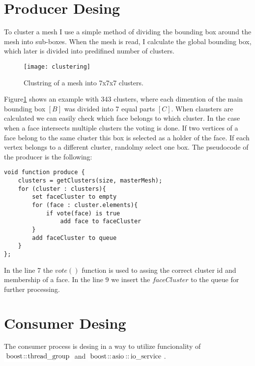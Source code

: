 \newpage
\section{Producer Desing}

To cluster a mesh I use a simple method of dividing the bounding box around the mesh into sub-boxes. When the mesh is read, I calculate the global bounding box, which later is divided into predifined number of clusters.

\begin{figure}[H]
  \begin{center}
    \texttt{[image: clustering]}
    \caption{Clustring of a mesh into 7x7x7 clusters.}
    \label{fig:clustering}
  \end{center}
\end{figure}

Figure\ref{fig:clustering} shows an example with 343 clusters, where each dimention of the main bounding box $[B]$ was divided into 7 equal parts $[C]$. When clausters are calculated we can easily check which face belongs to which cluster. In the case when a face intersects multiple clusters the voting is done. If two vertices of a face belong to the same cluster this box is selected as a holder of the face. If each vertex belongs to a different cluster, randolmy select one box. The pseudocode of the producer is the following:
\newline
\begin{center}
\begin{lstlisting}[caption={C style psuedocode of a producer},captionpos=b]
void function produce {
    clusters = getClusters(size, masterMesh);
    for (cluster : clusters){
        set faceCluster to empty
        for (face : cluster.elements){
            if vote(face) is true
                add face to faceCluster
        }
        add faceCluster to queue
    }
};
\end{lstlisting}
\end{center}

In the line 7 the $vote()$ function is used to assing the correct cluster id and membership of a face. In the line 9 we insert the $faceCluster$ to the queue for further processing.

\newpage
\section{Consumer Desing}

The consumer process is desing in a way to utilize funcionality of $\inlinecode{Java}{boost::thread_group}$ and $\inlinecode{Java}{boost::asio::io_service}$. 

